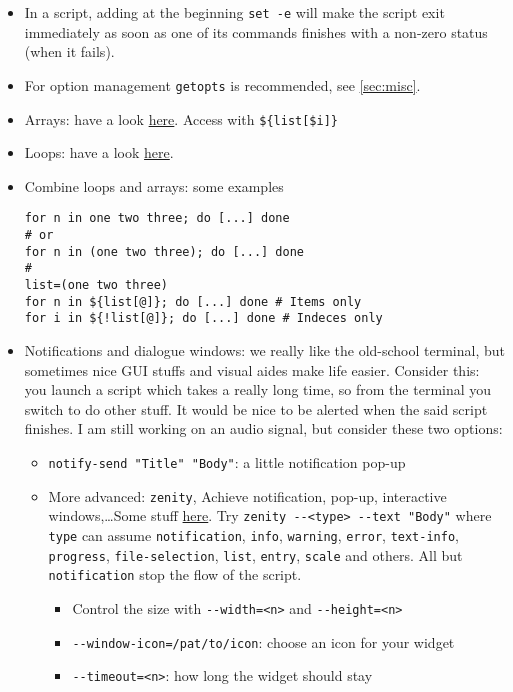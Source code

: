 \documentclass[a4paper,12pt,%
              final%
              ]{article}
\begin{document}
\begin{itemize}
\begin{itemize}
    \end{itemize}
  \item In a script, adding at the beginning \verb|set -e| will make the script exit immediately as soon as one of its commands finishes with a non-zero status (when it fails).
  \item For option management \verb|getopts| is recommended, see \autoref{sec:misc}.
  \item Arrays: have a look \href{https://opensource.com/article/18/5/you-dont-know-bash-intro-bash-arrays}{here}. Access with \verb|${list[$i]}|
  \item Loops: have a look \href{https://www.cyberciti.biz/faq/bash-for-loop/}{here}.
  \item Combine loops and arrays: some examples
\begin{verbatim}
for n in one two three; do [...] done
# or
for n in (one two three); do [...] done
#
list=(one two three)
for n in ${list[@]}; do [...] done # Items only
for i in ${!list[@]}; do [...] done # Indeces only
\end{verbatim}
  \item Notifications and dialogue windows: we really like the old-school terminal, but sometimes nice GUI stuffs and visual aides make life easier. Consider this: you launch a script which takes a really long time, so from the terminal you switch to do other stuff. It would be nice to be alerted when the said script finishes. I am still working on an audio signal, but consider these two options:
    \begin{itemize}
      \item \verb|notify-send "Title" "Body"|: a little notification pop-up
      \item More advanced: \verb|zenity|, Achieve notification, pop-up, interactive windows,\ldots Some stuff \href{https://renenyffenegger.ch/notes/Linux/shell/commands/zenity}{here}. Try \verb|zenity --<type> --text "Body"| where \texttt{type} can assume \texttt{notification}, \texttt{info}, \texttt{warning}, \texttt{error}, \texttt{text-info}, \texttt{progress}, \texttt{file-selection}, \texttt{list}, \texttt{entry}, \texttt{scale} and others. All but \texttt{notification} stop the flow of the script.
        \begin{itemize}
          \item Control the size with \verb|--width=<n>| and \verb|--height=<n>|
          \item \verb|--window-icon=/pat/to/icon|: choose an icon for your widget
          \item \verb|--timeout=<n>|: how long the widget should stay

\end{itemize}
\end{itemize}
\end{itemize}
\end{document}
